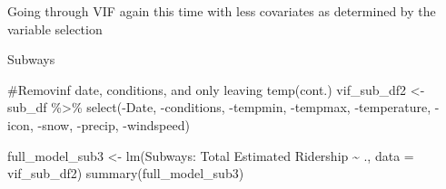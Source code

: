 \documentclass[
  letterpaper,
  DIV=11,
  numbers=noendperiod]{scrartcl}
\newenvironment{Shaded}{\begin{snugshade}}{\end{snugshade}}
\newcommand{\AttributeTok}[1]{\textcolor[rgb]{0.40,0.45,0.13}{#1}}
\newcommand{\CommentTok}[1]{\textcolor[rgb]{0.37,0.37,0.37}{#1}}
\newcommand{\FunctionTok}[1]{\textcolor[rgb]{0.28,0.35,0.67}{#1}}
\newcommand{\NormalTok}[1]{\textcolor[rgb]{0.00,0.23,0.31}{#1}}
\newcommand{\OtherTok}[1]{\textcolor[rgb]{0.00,0.23,0.31}{#1}}
\newcommand{\SpecialCharTok}[1]{\textcolor[rgb]{0.37,0.37,0.37}{#1}}
\newcommand{\StringTok}[1]{\textcolor[rgb]{0.13,0.47,0.30}{#1}}
\begin{document}
Going through VIF again this time with less covariates as determined by
the variable selection

Subways

\begin{Shaded}
\begin{Highlighting}[]
\CommentTok{\#Removinf date, conditions, and only leaving temp(cont.)}
\NormalTok{vif\_sub\_df2 }\OtherTok{\textless{}{-}}  
\NormalTok{  sub\_df }\SpecialCharTok{\%\textgreater{}\%}
  \FunctionTok{select}\NormalTok{(}\SpecialCharTok{{-}}\NormalTok{Date,}
         \SpecialCharTok{{-}}\NormalTok{conditions,}
         \SpecialCharTok{{-}}\NormalTok{tempmin,}
         \SpecialCharTok{{-}}\NormalTok{tempmax,}
         \SpecialCharTok{{-}}\NormalTok{temperature, }
         \SpecialCharTok{{-}}\NormalTok{icon,}
         \SpecialCharTok{{-}}\NormalTok{snow, }
         \SpecialCharTok{{-}}\NormalTok{precip,}
         \SpecialCharTok{{-}}\NormalTok{windspeed)}

\NormalTok{full\_model\_sub3 }\OtherTok{\textless{}{-}} \FunctionTok{lm}\NormalTok{(}\StringTok{\textasciigrave{}}\AttributeTok{Subways: Total Estimated Ridership}\StringTok{\textasciigrave{}} \SpecialCharTok{\textasciitilde{}}\NormalTok{ ., }\AttributeTok{data =}\NormalTok{ vif\_sub\_df2)}
\FunctionTok{summary}\NormalTok{(full\_model\_sub3)}
\end{Highlighting}
\end{Shaded}
\end{document}
